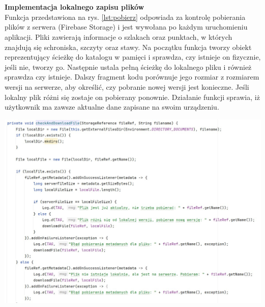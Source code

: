 \noindent
\begin{minipage}{\linewidth}
    \label{lst:rysowanie}
    \centering
\end{minipage}\\

\\
\noindent \textbf{Implementacja lokalnego zapisu plików} \\ 
\indent Funkcja przedstawiona na rys. \ref{lst:pobierz} odpowiada za kontrolę pobierania plików z serwera (Firebase Storage) i jest wywołana po każdym uruchomieniu aplikacji. Pliki zawierają informacje o szlakach oraz punktach, w których znajdują się schroniska, szczyty oraz stawy. Na początku funkcja tworzy obiekt reprezentujący ścieżkę do katalogu w pamięci i sprawdza, czy istnieje on fizycznie, jeśli nie, tworzy go. Następnie ustala pełną ścieżkę do lokalnego pliku i również sprawdza czy istnieje. Dalszy fragment kodu porównuje jego rozmiar z rozmiarem wersji na serwerze, aby określić, czy pobranie nowej wersji jest konieczne. Jeśli lokalny plik różni się zostaje on pobierany ponownie. Działanie funkcji sprawia, iż użytkownik ma zawsze aktualne dane zapisane na swoim urządzeniu. 
\\

\noindent
\begin{minipage}{\linewidth}
    \label{lst:pobierz}
    \centering
    \includegraphics[width=0.6\linewidth]{img/kod/imp-ckeckandadd.jpg}
\end{minipage}\\

